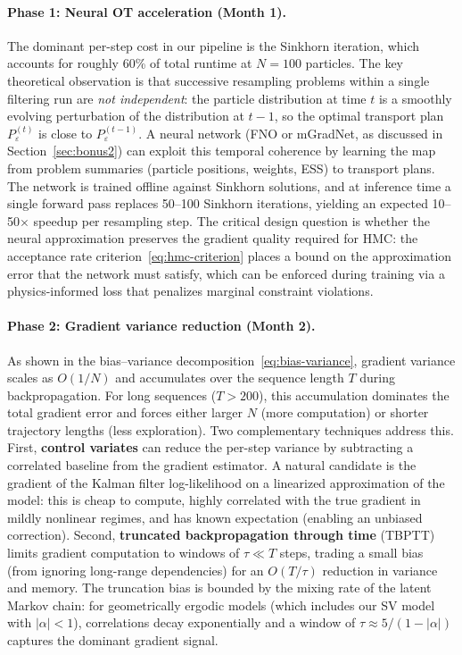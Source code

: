 \documentclass[12pt,a4paper]{article}
\theoremstyle{definition}
\theoremstyle{remark}
\begin{document}
\paragraph{Phase 1: Neural OT acceleration (Month 1).}
The dominant per-step cost in our pipeline is the Sinkhorn iteration, which accounts for roughly 60\% of total runtime at $N = 100$ particles. The key theoretical observation is that successive resampling problems within a single filtering run are \emph{not independent}: the particle distribution at time $t$ is a smoothly evolving perturbation of the distribution at $t-1$, so the optimal transport plan $P_\varepsilon^{(t)}$ is close to $P_\varepsilon^{(t-1)}$. A neural network (FNO or mGradNet, as discussed in Section~\ref{sec:bonus2}) can exploit this temporal coherence by learning the map from problem summaries (particle positions, weights, ESS) to transport plans. The network is trained offline against Sinkhorn solutions, and at inference time a single forward pass replaces 50--100 Sinkhorn iterations, yielding an expected 10--50$\times$ speedup per resampling step. The critical design question is whether the neural approximation preserves the gradient quality required for HMC: the acceptance rate criterion~\eqref{eq:hmc-criterion} places a bound on the approximation error that the network must satisfy, which can be enforced during training via a physics-informed loss that penalizes marginal constraint violations.

\paragraph{Phase 2: Gradient variance reduction (Month 2).}
As shown in the bias--variance decomposition~\eqref{eq:bias-variance}, gradient variance scales as $O(1/N)$ and accumulates over the sequence length $T$ during backpropagation. For long sequences ($T > 200$), this accumulation dominates the total gradient error and forces either larger $N$ (more computation) or shorter trajectory lengths (less exploration). Two complementary techniques address this. First, \textbf{control variates} can reduce the per-step variance by subtracting a correlated baseline from the gradient estimator. A natural candidate is the gradient of the Kalman filter log-likelihood on a linearized approximation of the model: this is cheap to compute, highly correlated with the true gradient in mildly nonlinear regimes, and has known expectation (enabling an unbiased correction). Second, \textbf{truncated backpropagation through time} (TBPTT) limits gradient computation to windows of $\tau \ll T$ steps, trading a small bias (from ignoring long-range dependencies) for an $O(T/\tau)$ reduction in variance and memory. The truncation bias is bounded by the mixing rate of the latent Markov chain: for geometrically ergodic models (which includes our SV model with $|\alpha| < 1$), correlations decay exponentially and a window of $\tau \approx 5 / (1 - |\alpha|)$ captures the dominant gradient signal.
\end{document}
